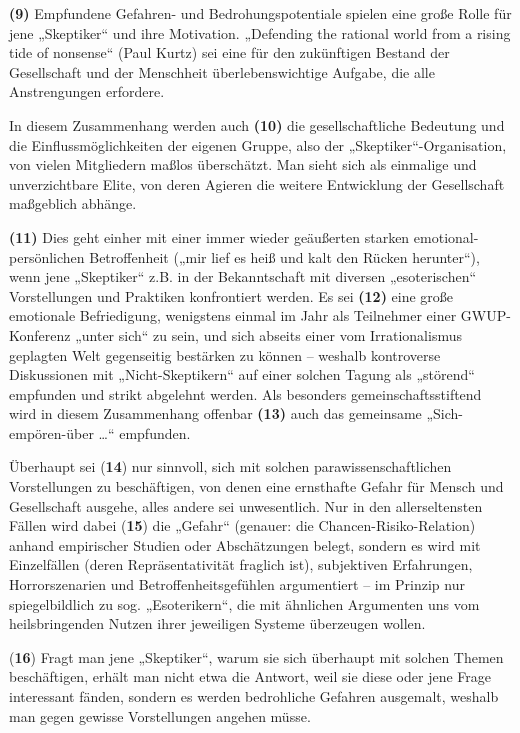 \textbf{(9)} Empfundene Gefahren- und Bedrohungspotentiale spielen eine
große Rolle für jene „Skeptiker`` und ihre Motivation. „Defending the
rational world from a rising tide of nonsense`` (Paul Kurtz) sei eine
für den zukünftigen Bestand der Gesellschaft und der Menschheit
überlebenswichtige Aufgabe, die alle Anstrengungen erfordere.

In diesem Zusammenhang werden auch \textbf{(10)} die gesellschaftliche
Bedeutung und die Einflussmöglichkeiten der eigenen Gruppe, also der
„Skeptiker``-Organisation, von vielen Mitgliedern maßlos überschätzt.
Man sieht sich als einmalige und unverzichtbare Elite, von deren Agieren
die weitere Entwicklung der Gesellschaft maßgeblich abhänge.

\textbf{(11)} Dies geht einher mit einer immer wieder geäußerten starken
emotional-persönlichen Betroffenheit („mir lief es heiß und kalt den
Rücken herunter``), wenn jene „Skeptiker`` z.B. in der Bekanntschaft mit
diversen „esoterischen`` Vorstellungen und Praktiken konfrontiert
werden. Es sei \textbf{(12)} eine große emotionale Befriedigung,
wenigstens einmal im Jahr als Teilnehmer einer GWUP-Konferenz „unter
sich`` zu sein, und sich abseits einer vom Irrationalismus geplagten
Welt gegenseitig bestärken zu können -- weshalb kontroverse Diskussionen
mit „Nicht-Skeptikern`` auf einer solchen Tagung als „störend``
empfunden und strikt abgelehnt werden. Als besonders
gemeinschaftsstiftend wird in diesem Zusammenhang offenbar \textbf{(13)}
auch das gemeinsame „Sich-empören-über \ldots{}`` empfunden.

Überhaupt sei (\textbf{14}) nur sinnvoll, sich mit solchen
parawissenschaftlichen Vorstellungen zu beschäftigen, von denen eine
ernsthafte Gefahr für Mensch und Gesellschaft ausgehe, alles andere sei
unwesentlich. Nur in den allerseltensten Fällen wird dabei (\textbf{15})
die „Gefahr`` (genauer: die Chancen-Risiko-Relation) anhand empirischer
Studien oder Abschätzungen belegt, sondern es wird mit Einzelfällen
(deren Repräsentativität fraglich ist), subjektiven Erfahrungen,
Horrorszenarien und Betroffenheitsgefühlen argumentiert -- im Prinzip
nur spiegelbildlich zu sog. „Esoterikern``, die mit ähnlichen Argumenten
uns vom heilsbringenden Nutzen ihrer jeweiligen Systeme überzeugen
wollen.

(\textbf{16}) Fragt man jene „Skeptiker``, warum sie sich überhaupt mit
solchen Themen beschäftigen, erhält man nicht etwa die Antwort, weil sie
diese oder jene Frage interessant fänden, sondern es werden bedrohliche
Gefahren ausgemalt, weshalb man gegen gewisse Vorstellungen angehen
müsse.

